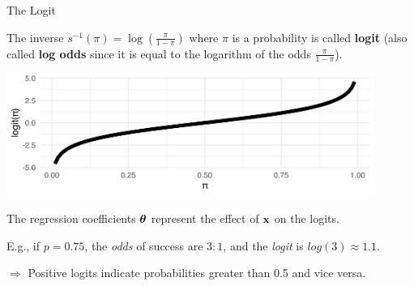 \documentclass[11pt,compress,t,notes=noshow, xcolor=table]{beamer}
\begin{document}
\begin{vbframe}{The Logit}

The inverse $s^{-1}(\pi) = \log\left(\frac{\pi}{1 - \pi}\right)$ where $\pi$ is a probability is called \textbf{logit} (also called \textbf{log odds} since it is equal to the logarithm of the odds $\frac{\pi}{1-\pi}$).

\begin{center}
\includegraphics[width=0.9\textwidth]{figure/logit_function.png}
\end{center}

The regression coefficients $\bm{\theta}$ represent the effect of $\mathbf{x}$ on the logits.

\lz

\small{E.g., if $p = 0.75$, the \textit{odds} of success are $3:1$, and the \textit{logit} is $log(3) \approx 1.1$.}

\vspace{1em}

$\Rightarrow$ Positive logits indicate probabilities greater than 0.5 and vice versa.
\end{vbframe}
\end{document}
